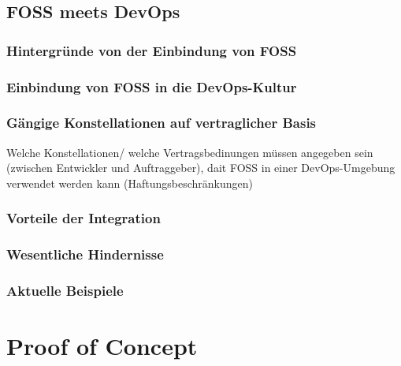 \documentclass[12pt,titlepage]{article}
\begin{document}
\subsection{FOSS meets DevOps}
\subsubsection{Hintergründe von der Einbindung von FOSS}
\subsubsection{Einbindung von FOSS in die DevOps-Kultur}
\subsubsection{Gängige Konstellationen auf vertraglicher Basis}
Welche Konstellationen/ welche Vertragsbedinungen müssen angegeben sein (zwischen Entwickler und Auftraggeber), dait FOSS in einer DevOps-Umgebung verwendet werden kann (Haftungsbeschränkungen)
\subsubsection{Vorteile der Integration}
\subsubsection{Wesentliche Hindernisse}
\subsubsection{Aktuelle Beispiele}




\section{Proof of Concept}


\end{document}
